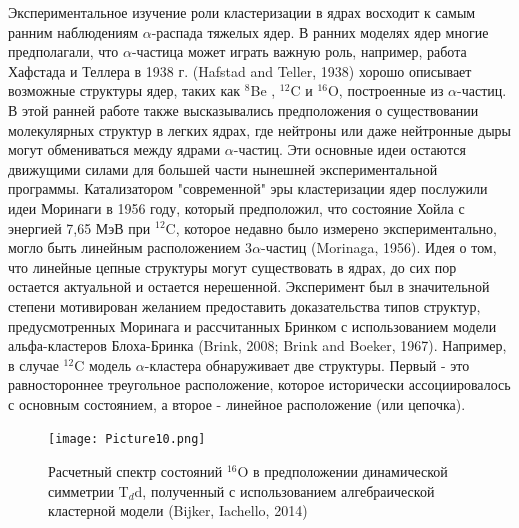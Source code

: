 \documentclass[fontsize=14pt]{scrreport}
\begin{document}
Экспериментальное изучение роли кластеризации в ядрах восходит к самым ранним наблюдениям $\alpha$-распада тяжелых ядер. В ранних моделях ядер многие предполагали, что $\alpha$-частица может играть важную роль, например, работа Хафстада и Теллера в 1938 г. (Hafstad and Teller, 1938) хорошо описывает возможные структуры ядер, таких как $^{8}$Be , $^{12}$C и $^{16}$O, построенные из $\alpha$-частиц. В этой ранней работе также высказывались предположения о существовании молекулярных структур в легких ядрах, где нейтроны или даже нейтронные дыры могут обмениваться между ядрами $\alpha$-частиц. Эти основные идеи остаются движущими силами для большей части нынешней экспериментальной программы. Катализатором "современной" эры кластеризации ядер послужили идеи Моринаги в 1956 году, который предположил, что состояние Хойла с энергией 7,65 МэВ при $^{12}$C, которое недавно было измерено экспериментально, могло быть линейным расположением 3$\alpha$-частиц (Morinaga, 1956). Идея о том, что линейные цепные структуры могут существовать в ядрах, до сих пор остается актуальной и остается нерешенной. Эксперимент был в значительной степени мотивирован желанием предоставить доказательства типов структур, предусмотренных Моринага и рассчитанных Бринком с использованием модели альфа-кластеров Блоха-Бринка (Brink, 2008; Brink and Boeker, 1967). Например, в случае $^{12}$C модель $\alpha$-кластера обнаруживает две структуры. Первый - это равностороннее треугольное расположение, которое исторически ассоциировалось с основным состоянием, а второе - линейное расположение (или цепочка).

\begin{figure}[!ht]
\texttt{[image: Picture10.png]}
\caption{Расчетный спектр состояний $^{16}$O в предположении динамической симметрии T$_{d}$d, полученный с использованием алгебраической кластерной модели (Bijker, Iachello, 2014)}
\label{fig10}
\end{figure}
\end{document}
